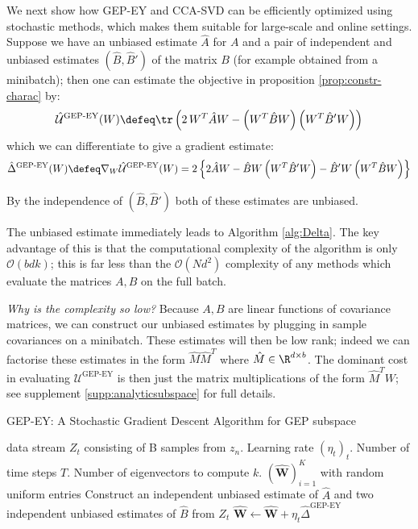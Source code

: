 We next show how GEP-EY and CCA-SVD can be efficiently optimized using stochastic methods, which makes them suitable for large-scale and online settings.
Suppose we have an unbiased estimate $\hat{A}$ for $A$ and a pair of independent and unbiased estimates $(\hat{B},\hat{B}')$ of the matrix $B$ (for example obtained from a minibatch); then one can estimate the objective in proposition \ref{prop:constr-charac} by:
\begin{align}
    \hat{\mathcal{U}}^\text{GEP-EY}(W) \defeq \tr \left( 2\, W^T \hat{A} W - \left(W^T \hat{B} W\right) \left(W^T \hat{B}' W\right) \right)
\end{align}
which we can differentiate to give a gradient estimate:
\begin{align}\label{eq:GEP-EY-grad}
    \hat{\Delta}^{\text{GEP-EY}}(W)
    \defeq \nabla_W \hat{\mathcal{U}}^\text{GEP-EY}(W)
    = 2 \left\{ 2 \hat{A} W - \hat{B} W \left(W^T \hat{B}' W \right) - \hat{B}' W \left(W^T \hat{B} W \right) \right\}
\end{align}

By the independence of $(\hat{B},\hat{B}')$ both of these estimates are unbiased.

The unbiased estimate immediately leads to Algorithm \ref{alg:Delta}.
The key advantage of this is that the computational complexity of the algorithm is only $\mathcal{O}(b d k)$; this is far less than the $\mathcal{O}(N d^2)$ complexity of any methods which evaluate the matrices $A,B$ on the full batch.

\textit{Why is the complexity so low?} Because $A,B$ are linear functions of covariance matrices, we can construct our unbiased estimates by plugging in sample covariances on a minibatch.
These estimates will then be low rank; indeed we can factorise these estimates in the form $\hat{M} \hat{M}^T$ where $\hat{M} \in \R^{d \times b}$. The dominant cost in evaluating $\mathcal{U}^\text{GEP-EY}$ is then just the matrix multiplications of the form $\hat{M}^T W$; see supplement \ref{supp:analyticsubspace} for full details.

\begin{algorithm}
    \caption{GEP-EY: A Stochastic Gradient Descent Algorithm for GEP subspace}
    \label{alg:Delta}
    \begin{algorithmic}
         data stream $Z_t$ consisting of B samples from $z_n$. Learning rate $(\eta_t)_t$. Number of time steps $T$. Number of eigenvectors to compute $k$.
         $(\hat{\mathbf {W}})_{i=1}^K$ with random uniform entries
        \STATE Construct an independent unbiased estimate of $\hat{A}$ and two independent unbiased estimates of $\hat{B}$ from $Z_t$
        \STATE $\hat{\mathbf {W}} \leftarrow \hat{\mathbf {W}}+\eta_{t} \hat{\Delta}^{\text{GEP-EY}}$
        \ENDFOR
    \end{algorithmic}
\end{algorithm}

